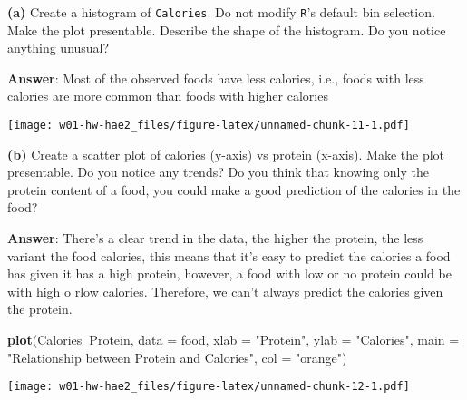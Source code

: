\documentclass[]{article}
\newenvironment{Shaded}{\begin{snugshade}}{\end{snugshade}}
\newcommand{\KeywordTok}[1]{\textcolor[rgb]{0.13,0.29,0.53}{\textbf{#1}}}
\newcommand{\DataTypeTok}[1]{\textcolor[rgb]{0.13,0.29,0.53}{#1}}
\newcommand{\StringTok}[1]{\textcolor[rgb]{0.31,0.60,0.02}{#1}}
\newcommand{\OperatorTok}[1]{\textcolor[rgb]{0.81,0.36,0.00}{\textbf{#1}}}
\newcommand{\NormalTok}[1]{#1}
\begin{document}
\textbf{(a)} Create a histogram of \texttt{Calories}. Do not modify
\texttt{R}'s default bin selection. Make the plot presentable. Describe
the shape of the histogram. Do you notice anything unusual?

\textbf{Answer}: Most of the observed foods have less calories, i.e.,
foods with less calories are more common than foods with higher calories

\begin{Shaded}
\end{Shaded}

\texttt{[image: w01-hw-hae2\_files/figure-latex/unnamed-chunk-11-1.pdf]}

\textbf{(b)} Create a scatter plot of calories (y-axis) vs protein
(x-axis). Make the plot presentable. Do you notice any trends? Do you
think that knowing only the protein content of a food, you could make a
good prediction of the calories in the food?

\textbf{Answer}: There's a clear trend in the data, the higher the
protein, the less variant the food calories, this means that it's easy
to predict the calories a food has given it has a high protein, however,
a food with low or no protein could be with high o rlow calories.
Therefore, we can't always predict the calories given the protein.

\begin{Shaded}
\begin{Highlighting}[]
\KeywordTok{plot}\NormalTok{(Calories}\OperatorTok{~}\NormalTok{Protein, }\DataTypeTok{data =}\NormalTok{ food,}
     \DataTypeTok{xlab =} \StringTok{"Protein"}\NormalTok{,}
     \DataTypeTok{ylab =} \StringTok{"Calories"}\NormalTok{,}
     \DataTypeTok{main =} \StringTok{"Relationship between Protein and Calories"}\NormalTok{,}
     \DataTypeTok{col =} \StringTok{"orange"}\NormalTok{)}
\end{Highlighting}
\end{Shaded}

\texttt{[image: w01-hw-hae2\_files/figure-latex/unnamed-chunk-12-1.pdf]}
\end{document}
